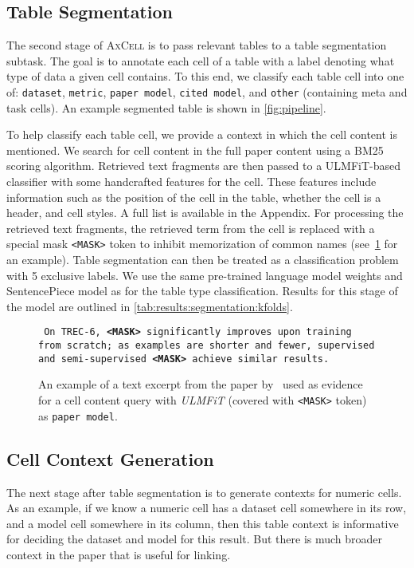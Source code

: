 \documentclass[11pt,a4paper]{article}
\newcommand{\model}{\textsc{AxCell}}
\begin{document}
\subsection{Table Segmentation}
The second stage of \model{} is to pass relevant tables to a table segmentation subtask. The goal is to annotate each cell of a table with a label denoting what type of data a given cell contains. To this end, we classify each table cell into one of: \texttt{dataset}, \texttt{metric}, \texttt{paper model}, \texttt{cited model}, and \texttt{other} (containing meta and task cells). An example segmented table is shown in \cref{fig:pipeline}.

To help classify each table cell, we provide a context in which the cell content is mentioned. We search for cell content in the full paper content using a BM25 scoring algorithm. Retrieved text fragments are then passed to a ULMFiT-based classifier with some handcrafted features for the cell. These features include information such as the position of the cell in the table, whether the cell is a header, and cell styles. A full list is available in the Appendix. For processing the retrieved text fragments, the retrieved term from the cell is replaced with a special mask \texttt{<MASK>} token to inhibit memorization of common names (see~\cref{fig:cell-evidences} for an example). Table segmentation can then be treated as a classification problem with 5 exclusive labels. We use the same pre-trained language model weights and SentencePiece model as for the table type classification. Results for this stage of the model are outlined in \cref{tab:results:segmentation:kfolds}.

\begin{figure}
\texttt{
    On TREC-6, \textbf{<MASK>} significantly improves upon training from scratch; as examples are shorter and fewer, supervised and semi-supervised \textbf{<MASK>} achieve similar results.
}
    \caption{An example of a text excerpt from the paper by~\citet{ulmfit} used as evidence for a cell content query with \textit{ULMFiT} (covered with \texttt{<MASK>} token) as \texttt{paper model}.\\}
    \label{fig:cell-evidences}
\end{figure}


\subsection{Cell Context Generation}

The next stage after table segmentation is to generate contexts for numeric cells. As an example, if we know a numeric cell has a dataset cell somewhere in its row, and a model cell somewhere in its column, then this table context is informative for deciding the dataset and model for this result. But there is much broader context in the paper that is useful for linking.
\end{document}
